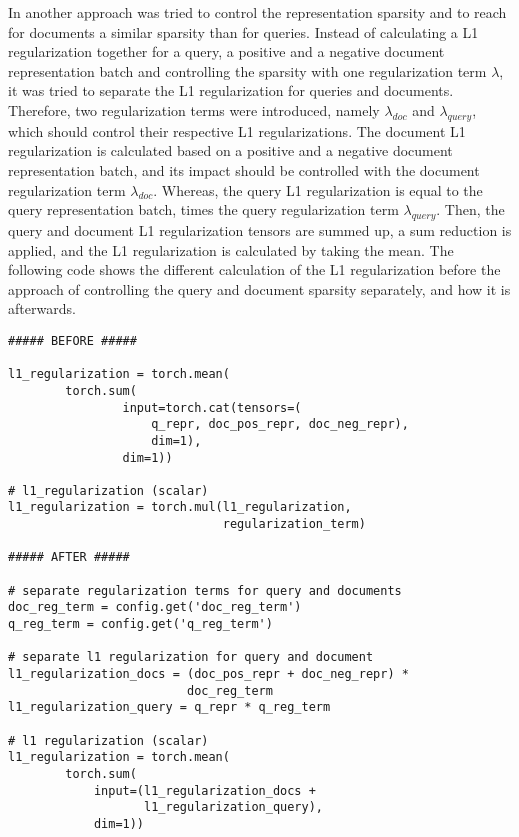 In another approach was tried to control the representation sparsity and to reach for documents a similar
    sparsity than for queries.
Instead of calculating a L1 regularization together for a query, a positive and a negative document 
    representation batch and controlling the sparsity with one regularization term $\lambda$,
    it was tried to separate the L1 regularization for queries and documents.
Therefore, two regularization terms were introduced, namely $\lambda_{doc}$ and $\lambda_{query}$,
    which should control their respective L1 regularizations.
The document L1 regularization is calculated based on a positive and a negative document representation batch,
    and its impact should be controlled with the document regularization term $\lambda_{doc}$.
Whereas, the query L1 regularization is equal to the query representation batch, times the 
    query regularization term $\lambda_{query}$.
Then, the query and document L1 regularization tensors are summed up, a sum reduction is applied,
    and the L1 regularization is calculated by taking the mean.
The following code shows the different calculation of the L1 regularization before the approach
    of controlling the query and document sparsity separately, and how it is afterwards.
\begin{verbatim}
##### BEFORE #####

l1_regularization = torch.mean(
        torch.sum(
                input=torch.cat(tensors=(
                    q_repr, doc_pos_repr, doc_neg_repr),
                    dim=1), 
                dim=1))

# l1_regularization (scalar)
l1_regularization = torch.mul(l1_regularization, 
                              regularization_term)

##### AFTER #####

# separate regularization terms for query and documents
doc_reg_term = config.get('doc_reg_term') 
q_reg_term = config.get('q_reg_term')

# separate l1 regularization for query and document
l1_regularization_docs = (doc_pos_repr + doc_neg_repr) * 
                         doc_reg_term 
l1_regularization_query = q_repr * q_reg_term

# l1 regularization (scalar)
l1_regularization = torch.mean(
        torch.sum(
            input=(l1_regularization_docs + 
                   l1_regularization_query), 
            dim=1))
\end{verbatim}

